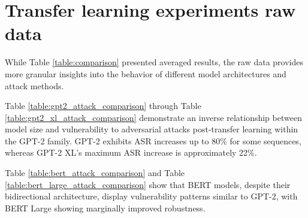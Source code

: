 \documentclass{article}
\begin{document}







\section{Transfer learning experiments raw data} \label{app:transf_raw}
While Table \ref{table:comparison} presented averaged results, the raw data provides more granular insights into the behavior of different model architectures and attack methods.

Table \ref{table:gpt2_attack_comparison} through Table \ref{table:gpt2_xl_attack_comparison} demonstrate an inverse relationship between model size and vulnerability to adversarial attacks post-transfer learning within the GPT-2 family. GPT-2 exhibits ASR increases up to 80\% for some sequences, whereas GPT-2 XL's maximum ASR increase is approximately 22\%.

Table \ref{table:bert_attack_comparison} and Table \ref{table:bert_large_attack_comparison} show that BERT models, despite their bidirectional architecture, display vulnerability patterns similar to GPT-2, with BERT Large showing marginally improved robustness.
\end{document}

